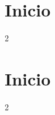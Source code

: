 
\limpar



\section*{Inicio}

\begin{multicols}{2}
\raggedcolumns



\end{multicols}




\limpar


\section*{Inicio}

\begin{multicols}{2}
\raggedcolumns


    
\end{multicols}

